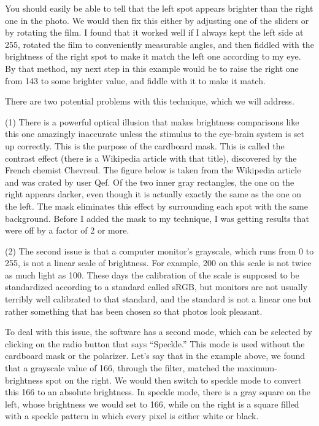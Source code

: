 You should easily be able to tell that the left spot appears brighter than the right
one in the photo. We would then fix this either by adjusting one of the sliders or
by rotating the film. I found that it worked well if I always kept the left side
at 255, rotated the film to conveniently measurable angles, and then fiddled with
the brightness of the right spot to make it match the left one according to my eye.
By that method, my next step in this example would be to raise the right one from
143 to some brighter value, and fiddle with it to make it match.

There are two potential problems with this technique, which we will address.

(1) There is a powerful optical illusion that makes brightness comparisons
like this one amazingly inaccurate unless the stimulus to the eye-brain system
is set up correctly. This is the purpose of the cardboard mask. This is called
the contrast effect (there is a Wikipedia article with that title), discovered
by the French chemist Chevreul.  The figure below is taken from the Wikipedia
article and was crated by user Qef. Of the two inner gray rectangles, the one
on the right appears darker, even though it is actually exactly the same as
the one on the left. The mask eliminates this effect by surrounding each spot
with the same background.
Before I added the mask to my technique, I was getting
results that were off by a factor of 2 or more. 


(2) The second issue is that a computer monitor's grayscale, which runs from 0 to 255,
is not a linear scale of brightness. For example, 200 on this scale is not twice as
much light as 100. These days the calibration of the scale is supposed to be standardized
according to a standard called sRGB, but monitors are not usually terribly well calibrated
to that standard, and the standard is not a linear one but rather something that has
been chosen so that photos look pleasant.

To deal with this issue, the software has a second mode, which can be selected by
clicking on the radio button that says ``Speckle.'' This mode is used without the
cardboard mask or the polarizer. Let's say that in the example above, we found that
a grayscale value of 166, through the filter, matched the maximum-brightness spot
on the right. We would then switch to speckle mode to convert this 166 to an absolute
brightness. In speckle mode, there is a gray square on the left, whose brightness we
would set to 166, while on the right is a square filled with a speckle pattern in which
every pixel is either white or black. 

